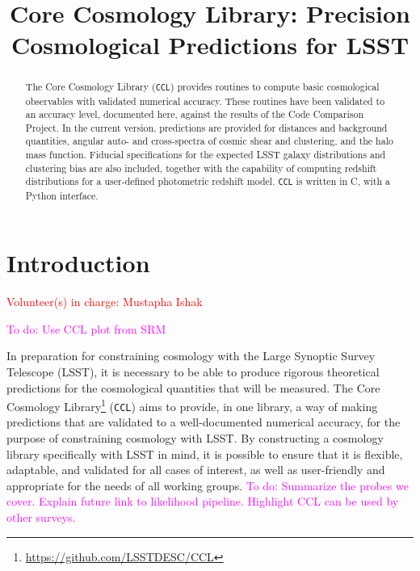 \documentclass[\docopts]{\docclass}
\newcommand{\todo}[1]{\textcolor{magenta}{To do: #1}}
\newcommand{\vol}[1]{\textcolor{red}{Volunteer(s) in charge: #1}}
\newcommand{\ccl}{{\tt CCL}\xspace}
\begin{document}
\title{Core Cosmology Library: Precision Cosmological Predictions for LSST}

\maketitlepre

\begin{abstract}

The Core Cosmology Library (\ccl) provides routines to compute basic cosmological observables with validated numerical accuracy. These routines have been validated to an accuracy level, documented here, against the results of the Code Comparison Project. In the current version, predictions are provided for distances and background quantities, angular auto- and cross-spectra of cosmic shear and clustering, and the halo mass function. Fiducial specifications for the expected LSST galaxy distributions and clustering bias are also included, together with the capability of computing redshift distributions for a user-defined photometric redshift model. \ccl is written in C, with a Python interface.

\end{abstract}


\maketitlepost

\newpage
\tableofcontents{}
\newpage



\section{Introduction}
\label{sec:intro}
\vol{Mustapha Ishak}

\todo{Use CCL plot from SRM}

In preparation for constraining cosmology with the Large Synoptic Survey Telescope (LSST), it is necessary to be able to produce rigorous theoretical predictions for the cosmological quantities that will be measured. The Core Cosmology Library\footnote{\url{https://github.com/LSSTDESC/CCL}} (\ccl) aims to provide, in one library, a way of making predictions that are validated to a well-documented numerical accuracy, for the purpose of constraining cosmology with LSST. By constructing a cosmology library specifically with LSST in mind, it is possible to ensure that it is flexible, adaptable, and validated for all cases of interest, as well as user-friendly and appropriate for the needs of all working groups.
\todo{Summarize the probes we cover. Explain future link to likelihood pipeline. Highlight CCL can be used by other surveys.}
\end{document}

